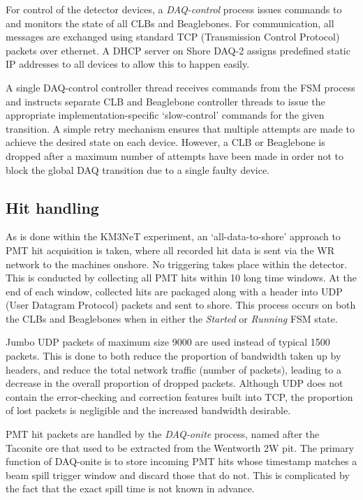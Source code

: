 For control of the detector devices, a \emph{DAQ-control} process issues commands to and monitors
the state of all CLBs and Beaglebones. For communication, all messages are exchanged using
standard TCP (Transmission Control Protocol) packets over ethernet. A DHCP server on Shore DAQ-2
assigns predefined static IP addresses to all devices to allow this to happen easily. 

A single DAQ-control controller thread receives commands from the FSM process and instructs
separate CLB and Beaglebone controller threads to issue the appropriate implementation-specific
`slow-control' commands for the given transition. A simple retry mechanism ensures that multiple
attempts are made to achieve the desired state on each device. However, a CLB or Beaglebone is
dropped after a maximum number of attempts have been made in order not to block the global DAQ
transition due to a single faulty device.

\subsection{Hit handling} %
\label{sec:daq_soft_hits} %

As is done within the KM3NeT experiment, an `all-data-to-shore' approach to PMT hit acquisition is
taken, where all recorded hit data is sent via the WR network to the machines onshore. No
triggering takes place within the detector. This is conducted by collecting all PMT hits within
\SI{10}{} long time windows. At the end of each window, collected hits are packaged along
with a header into UDP (User Datagram Protocol) packets and sent to shore. This process occurs on
both the CLBs and Beaglebones when in either the \emph{Started} or \emph{Running} FSM state.

Jumbo UDP packets of maximum size \SI{9000}{} are used instead of typical
\SI{1500}{} packets. This is done to both reduce the proportion of bandwidth taken up
by headers, and reduce the total network traffic (number of packets), leading to a decrease in the
overall proportion of dropped packets. Although UDP does not contain the error-checking and
correction features built into TCP, the proportion of lost packets is negligible and the increased
bandwidth desirable.

PMT hit packets are handled by the \emph{DAQ-onite} process, named after the Taconite ore that
used to be extracted from the Wentworth 2W pit. The primary function of DAQ-onite is to store
incoming PMT hits whose timestamp matches a \numi beam spill trigger window and discard those that
do not. This is complicated by the fact that the exact \numi spill time is not known in advance. 

